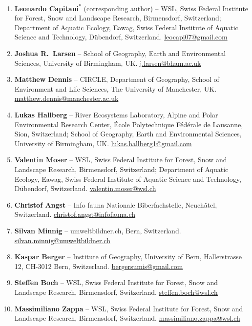 \documentclass[11pt,a4paper]{article}
\begin{document}
\begin{enumerate}[leftmargin=*,itemsep=0.3em]
\item \textbf{Leonardo Capitani}\textsuperscript{*} (corresponding author) -- WSL, Swiss Federal Institute for Forest, Snow and Landscape Research, Birmensdorf, Switzerland; Department of Aquatic Ecology, Eawag, Swiss Federal Institute of Aquatic Science and Technology, D\"ubendorf, Switzerland. \href{mailto:leocapi07@gmail.com}{leocapi07@gmail.com}
\item \textbf{Joshua R.\ Larsen} -- School of Geography, Earth and Environmental Sciences, University of Birmingham, UK. \href{mailto:j.larsen@bham.ac.uk}{j.larsen@bham.ac.uk}
\item \textbf{Matthew Dennis} -- CIRCLE, Department of Geography, School of Environment and Life Sciences, The University of Manchester, UK. \href{mailto:matthew.dennis@manchester.ac.uk}{matthew.dennis@manchester.ac.uk}
\item \textbf{Lukas Hallberg} -- River Ecosystems Laboratory, Alpine and Polar Environmental Research Center, \'Ecole Polytechnique F\'ed\'erale de Lausanne, Sion, Switzerland; School of Geography, Earth and Environmental Sciences, University of Birmingham, UK. \href{mailto:lukas.hallberg1@gmail.com}{lukas.hallberg1@gmail.com}
\item \textbf{Valentin Moser} -- WSL, Swiss Federal Institute for Forest, Snow and Landscape Research, Birmensdorf, Switzerland; Department of Aquatic Ecology, Eawag, Swiss Federal Institute of Aquatic Science and Technology, D\"ubendorf, Switzerland. \href{mailto:valentin.moser@wsl.ch}{valentin.moser@wsl.ch}
\item \textbf{Christof Angst} -- Info fauna Nationale Biberfachstelle, Neuch\^atel, Switzerland. \href{mailto:christof.angst@infofauna.ch}{christof.angst@infofauna.ch}
\item \textbf{Silvan Minnig} -- umweltbildner.ch, Bern, Switzerland. \href{mailto:silvan.minnig@umweltbildner.ch}{silvan.minnig@umweltbildner.ch}
\item \textbf{Kaspar Berger} -- Institute of Geography, University of Bern, Hallerstrasse 12, CH-3012 Bern, Switzerland. \href{mailto:bergersumis@gmail.com}{bergersumis@gmail.com}
\item \textbf{Steffen Boch} -- WSL, Swiss Federal Institute for Forest, Snow and Landscape Research, Birmensdorf, Switzerland. \href{mailto:steffen.boch@wsl.ch}{steffen.boch@wsl.ch}
\item \textbf{Massimiliano Zappa} -- WSL, Swiss Federal Institute for Forest, Snow and Landscape Research, Birmensdorf, Switzerland. \href{mailto:massimiliano.zappa@wsl.ch}{massimiliano.zappa@wsl.ch}

\end{enumerate}
\end{document}
